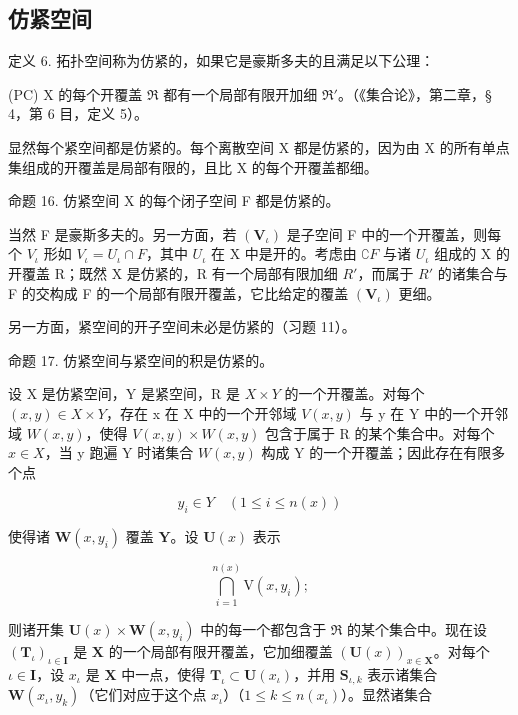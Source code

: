 \subsection{仿紧空间}

定义 6. 拓扑空间称为仿紧的，如果它是豪斯多夫的且满足以下公理：

(PC) X 的每个开覆盖 \(\Re\) 都有一个局部有限开加细 \(\Re'\)。（《集合论》，第二章，§ 4，第 6 目，定义 5）。

显然每个紧空间都是仿紧的。每个离散空间 X 都是仿紧的，因为由 X 的所有单点集组成的开覆盖是局部有限的，且比 X 的每个开覆盖都细。

命题 16. 仿紧空间 X 的每个闭子空间 F 都是仿紧的。

当然 F 是豪斯多夫的。另一方面，若 \((\mathbf{V}_{\iota})\) 是子空间 F 中的一个开覆盖，则每个 \(V_{\iota}\) 形如 \(V_{\iota} = U_{\iota} \cap F\)，其中 \(U_{\iota}\) 在 X 中是开的。考虑由 \(\complement F\) 与诸 \(U_{\iota}\) 组成的 X 的开覆盖 R；既然 X 是仿紧的，R 有一个局部有限加细 \(R'\)，而属于 \(R'\) 的诸集合与 F 的交构成 F 的一个局部有限开覆盖，它比给定的覆盖 \((\mathbf{V}_{\iota})\) 更细。

另一方面，紧空间的开子空间未必是仿紧的（习题 11）。

命题 17. 仿紧空间与紧空间的积是仿紧的。

设 X 是仿紧空间，Y 是紧空间，R 是 \(X \times Y\) 的一个开覆盖。对每个 \((x, y) \in X \times Y\)，存在 x 在 X 中的一个开邻域 \(V(x, y)\) 与 y 在 Y 中的一个开邻域 \(W(x, y)\)，使得 \(V(x, y) \times W(x, y)\) 包含于属于 R 的某个集合中。对每个 \(x \in X\)，当 y 跑遍 Y 时诸集合 \(W(x, y)\) 构成 Y 的一个开覆盖；因此存在有限多个点

\[
y _ {i} \in Y \quad (1 \leqslant i \leqslant n (x))
\]

使得诸 \(\mathbf{W}(x, y_i)\) 覆盖 \(\mathbf{Y}\)。设 \(\mathbf{U}(x)\) 表示

\[
\bigcap_ {i = 1} ^ {n (x)} \mathrm{V} (x, y _ {i});
\]

则诸开集 \(\mathbf{U}(x) \times \mathbf{W}(x, y_i)\) 中的每一个都包含于 \(\Re\) 的某个集合中。现在设 \((\mathbf{T}_{\iota})_{\iota \in \mathbf{I}}\) 是 \(\mathbf{X}\) 的一个局部有限开覆盖，它加细覆盖 \((\mathbf{U}(x))_{x \in \mathbf{X}}\)。对每个 \(\iota \in \mathbf{I}\)，设 \(x_{\iota}\) 是 \(\mathbf{X}\) 中一点，使得 \(\mathbf{T}_{\iota} \subset \mathbf{U}(x_{\iota})\)，并用 \(\mathbf{S}_{\iota,k}\) 表示诸集合 \(\mathbf{W}(x_{\iota}, y_k)\)（它们对应于这个点 \(x_{\iota}\)）（\(1 \leqslant k \leqslant n(x_{\iota})\)）。显然诸集合

